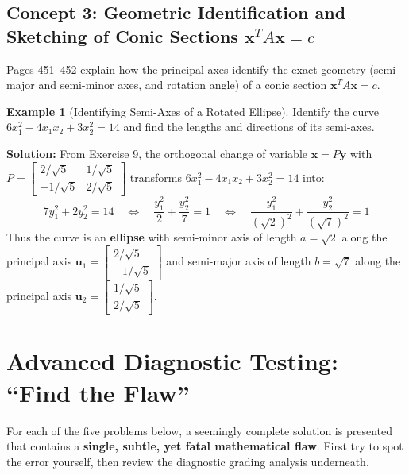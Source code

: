 \documentclass[11pt, letterpaper]{article}
\theoremstyle{definition}
\newtheorem{example}{Example}[section]
\theoremstyle{remark}
\begin{document}
\subsection{Concept 3: Geometric Identification and Sketching of Conic Sections $\mathbf{x}^T A \mathbf{x} = c$}
Pages 451--452 explain how the principal axes identify the exact geometry (semi-major and semi-minor axes, and rotation angle) of a conic section $\mathbf{x}^T A \mathbf{x} = c$.

\begin{example}[Identifying Semi-Axes of a Rotated Ellipse]
Identify the curve $6x_1^2 - 4x_1x_2 + 3x_2^2 = 14$ and find the lengths and directions of its semi-axes.

\textbf{Solution:} From Exercise 9, the orthogonal change of variable $\mathbf{x} = P\mathbf{y}$ with $P = \begin{bmatrix} 2/\sqrt{5} & 1/\sqrt{5} \\ -1/\sqrt{5} & 2/\sqrt{5} \end{bmatrix}$ transforms $6x_1^2 - 4x_1x_2 + 3x_2^2 = 14$ into:
\[
7y_1^2 + 2y_2^2 = 14 \quad \Longleftrightarrow \quad \frac{y_1^2}{2} + \frac{y_2^2}{7} = 1 \quad \Longleftrightarrow \quad \frac{y_1^2}{(\sqrt{2})^2} + \frac{y_2^2}{(\sqrt{7})^2} = 1
\]
Thus the curve is an \textbf{ellipse} with semi-minor axis of length $a = \sqrt{2}$ along the principal axis $\mathbf{u}_1 = \begin{bmatrix} 2/\sqrt{5} \\ -1/\sqrt{5} \end{bmatrix}$ and semi-major axis of length $b = \sqrt{7}$ along the principal axis $\mathbf{u}_2 = \begin{bmatrix} 1/\sqrt{5} \\ 2/\sqrt{5} \end{bmatrix}$.
\end{example}

\newpage
\section{Advanced Diagnostic Testing: ``Find the Flaw''}

For each of the five problems below, a seemingly complete solution is presented that contains a \textbf{single, subtle, yet fatal mathematical flaw}. First try to spot the error yourself, then review the diagnostic grading analysis underneath.
\end{document}
